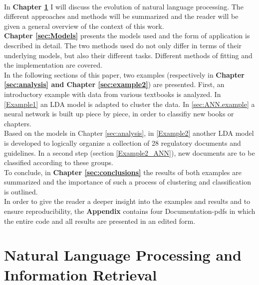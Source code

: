 \documentclass[11pt,a4paper]{article}
\begin{document}
\ \\
In \textbf{Chapter \ref{sec:NLP}} I will discuss the evolution of natural language processing. The different approaches and methods will be summarized and the reader will be given a general overview of the context of this work.\\
\textbf{Chapter \ref{sec:Models}} presents the models used and the form of application is described in detail. The two methods used do not only differ in terms of their underlying models, but also their different tasks. Different methods of fitting and the implementation are covered.\\
In the following sections of this paper, two examples (respectively in \textbf{Chapter \ref{sec:analysis} and Chapter \ref{sec:example2}}) are presented. First, an introductory example with data from various textbooks is analyzed. In \ref{Example1} an LDA model is adapted to cluster the data. In \ref{sec:ANN.example} a neural network is built up piece by piece, in order to classifiy new books or chapters.\\
Based on the models in Chapter \ref{sec:analysis}, in \ref{Example2} another LDA model is developed to logically organize a collection of 28 regulatory documents and guidelines. In a second step (section \ref{Example2_ANN}), new documents are to be classified according to these groups.\\
To conclude, in \textbf{Chapter \ref{sec:conclusions}} the results of both examples are summarized and the importance of such a process of clustering and classification is outlined.\\
In order to give the reader a deeper insight into the examples and results and to ensure reproducibility, the \textbf{Appendix} contains four Documentation-pdfs in which the entire code and all results are presented in an edited form.


	
	

\section{Natural Language Processing and Information Retrieval} \label{sec:NLP}
\end{document}
